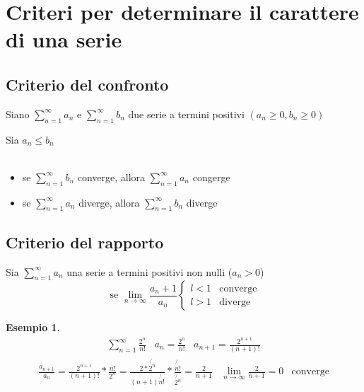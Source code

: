 \documentclass{book}
\newtheorem{esempio}{Esempio}
\begin{document}
\section{Criteri per determinare il carattere di una serie}
\subsection{Criterio del confronto}
Siano $\displaystyle\sum_{n=1}^\infty a_n$ e $\displaystyle\sum_{n=1}^\infty b_n$ due serie a termini positivi $(a_n\geq 0, b_n\geq 0)$
\begin{multicols}{2}
  Sia $a_n\leq b_n$\\\\
  \begin{itemize}
  \item se $\displaystyle\sum_{n=1}^\infty b_n$ converge, allora $\displaystyle\sum_{n=1}^\infty a_n$ congerge
    \item se $\displaystyle\sum_{n=1}^\infty a_n$ diverge, allora $\displaystyle\sum_{n=1}^\infty b_n$ diverge 
  \end{itemize} 
\end{multicols}
\subsection{Criterio del rapporto}
Sia $\sum_{n=1}^\infty a_n$ una serie a termini positivi non nulli ($a_n>0$)
\begin{equation*}
  \text{ se } \lim_{n\to \infty} \frac{a_n+1}{a_n}\begin{cases}
                                                    l<1 & \text{converge}\\
                                                    l>1 & \text{diverge}
                                                  \end{cases}
\end{equation*}
\clearpage
\begin{esempio}
  \begin{eqnarray*}
    \displaystyle\sum_{n=1}^{\infty}\frac{2^n}{n!} & a_n=\frac{2^n}{n!} & a_{n+1}=\frac{2^{n+1}}{(n+1)!} 
  \end{eqnarray*}
  \begin{eqnarray*}
    \frac{a_{n+1}}{a_n}=\frac{2^{n+1}}{(n+1)!}*\frac{n!}{2^n}
    =\frac{2*\not{2^n}}{(n+1)\not{n!}}*\frac{\not{n!}}{\not{2^n}}=\frac{2}{n+1}
    & \lim_{n\to \infty} \frac{2}{n+1} = 0 & \text{converge}
  \end{eqnarray*} 
\end{esempio}
\end{document}
